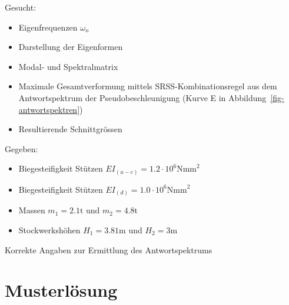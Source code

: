 \documentclass[
  letterpaper,
  DIV=11]{scrreprt}
\providecommand{\tightlist}{%
  \setlength{\itemsep}{0pt}\setlength{\parskip}{0pt}}\usepackage{longtable,booktabs,array}
\begin{document}
Gesucht:

\begin{itemize}
\tightlist
\item
  Eigenfrequenzen \(\omega_n\)
\item
  Darstellung der Eigenformen
\item
  Modal- und Spektralmatrix
\item
  Maximale Gesamtverformung mittels SRSS-Kombinationsregel aus dem
  Antwortspektrum der Pseudobeschleunigung (Kurve E in
  Abbildung~\ref{fig-antwortspektren})
\item
  Resultierende Schnittgrössen
\end{itemize}

Gegeben:

\begin{itemize}
\tightlist
\item
  Biegesteifigkeit Stützen \(EI_{(a-c)} = 1.2 \cdot 10^6 \text{Nmm}^2\)
\item
  Biegesteifigkeit Stützen \(EI_{(d)} = 1.0 \cdot 10^6 \text{Nmm}^2\)
\item
  Massen \(m_1 = 2.1 \text{t}\) und \(m_2 = 4.8 \text{t}\)
\item
  Stockwerkshöhen \(H_1 = 3.81\text{m}\) und \(H_2 = 3 \text{m}\)
\end{itemize}

Korrekte Angaben zur Ermittlung des Antwortspektrums

\newpage{}

\hypertarget{musterluxf6sung-12}{%
\section{Musterlösung}\label{musterluxf6sung-12}}
\end{document}
